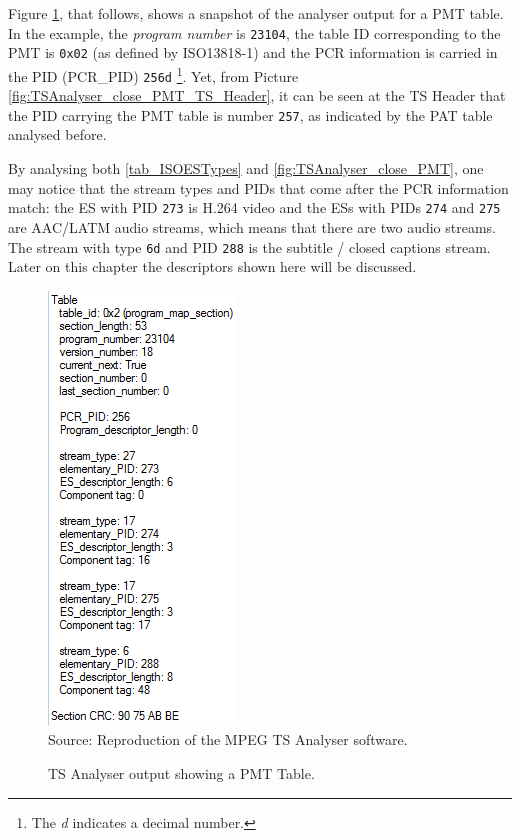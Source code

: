 \documentclass[
	12pt,				%
	openright,			%
	twoside,			%
	a4paper,			%
	brazil,
	french,				%
	english
	]{abntex2}
\begin{document}
Figure \ref{fig:TSAnalyser_close_PMT}, that follows, shows a snapshot of the analyser output for a PMT table. In the example, the \textit{program number} is \texttt{23104}, the table ID corresponding to the PMT is \texttt{0x02} (as defined by ISO13818-1) and the PCR information is carried in the PID (PCR\_PID) \texttt{256d} \footnote{The \textit{d} indicates a decimal number.}. Yet, from Picture \ref{fig:TSAnalyser_close_PMT_TS_Header}, it can be seen at the TS Header that the PID carrying the PMT table is number \texttt{257}, as indicated by the PAT table analysed before.

By analysing both \autoref{tab_ISOESTypes} and \autoref{fig:TSAnalyser_close_PMT}, one may notice that the stream types and PIDs that come after the PCR information match: the ES with PID \texttt{273} is H.264 video and the ESs with PIDs \texttt{274} and \texttt{275} are AAC/LATM audio streams, which means that there are two audio streams. The stream with type \texttt{6d} and PID \texttt{288} is the subtitle / closed captions stream. Later on this chapter the descriptors shown here will be discussed.

\begin{figure}[!hb]
\centering
\caption{TS Analyser output showing a PMT Table.}
\includegraphics[width=0.4\linewidth]{figuras/TSAnalyser_close_PMT.png}
\\Source: Reproduction of the MPEG TS Analyser software.
\label{fig:TSAnalyser_close_PMT}
\end{figure}
\end{document}
